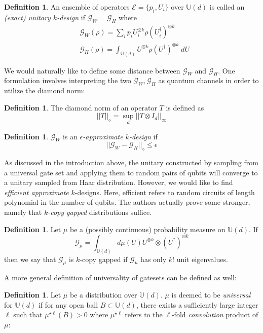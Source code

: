 \documentclass[12pt]{amsart}
\theoremstyle{definition}
\newtheorem{definition}[theorem]{Definition}
\theoremstyle{remark}
\numberwithin{equation}{section}
\theoremstyle{remark}
\begin{document}
\begin{definition}
  An ensemble of operators $\mathcal{E} = \{p_i, U_i\}$ over $\mathbb{U}(d)$ is called an \emph{(exact) unitary $k$-design} if $\mathcal{G}_W = \mathcal{G}_H$ where
  \begin{align}
    & \mathcal{G}_W(\rho) = \sum_{i} p_i U_i^{\otimes k}\rho (U_i^{\dagger})^{\otimes k} \\
    & \mathcal{G}_H(\rho) = \int_{\mathbb{U}(d)} U^{\otimes k} \rho (U^\dagger)^{\otimes k} \; dU
  \end{align}
\end{definition}
%
 We would naturally like to define some distance between $\mathcal{G}_W$ and $\mathcal{G}_H$. One formulation involves interpreting the two $\mathcal{G}_W, \mathcal{G}_H$ as quantum channels in order to utilize the diamond norm:
%
\begin{definition}
  The diamond norm of an operator $T$ is defined as
  $$||T||_{\diamond} = \sup_d ||T \otimes I_d ||_{\infty} $$
\end{definition}
%
\begin{definition}
  $\mathcal{G}_W$ is an \emph{$\epsilon$-approximate $k$-design} if
  \begin{equation}
    ||\mathcal{G}_W - \mathcal{G}_H ||_{\diamond}  \leq \epsilon
  \end{equation}
\end{definition}
%
As discussed in the introduction above, the unitary constructed by sampling from a universal gate set and applying them to random pairs of qubits will converge to a unitary sampled from Haar distribution. However, we would like to find \emph{efficient approximate} $k$-designs. Here, efficient refers to random circuits of length polynomial in the number of qubits. The authors actually prove some stronger, namely that \emph{$k$-copy gapped} distributions suffice.
%
\begin{definition} \label{gappeddef}
  Let $\mu$ be a (possibly continuous) probability measure on $\mathbb{U}(d)$. If
  \begin{equation}
    \mathcal{G}_{\mu} = \int_{\mathbb{U}(d)} d\mu(U) U^{\otimes k} \otimes (U^*)^{\otimes k}
  \end{equation}
  then we say that $\mathcal{G}_\mu$ is $k$-copy gapped if $\mathcal{G}_\mu$ has only $k!$ unit eigenvalues.
\end{definition}
%
\noindent A more general definition of universality of gatesets can be defined as well:
%
\begin{definition} \label{univdef}
  Let $\mu$ be a distribution over $\mathbb{U}(d)$. $\mu$ is deemed to be \emph{universal} for $\mathbb{U}(d)$ if for any open ball $B \subset \mathbb{U}(d)$, there exists a sufficiently large integer $\ell$ such that $\mu^{\star \ell}(B) > 0$
  where $\mu^{\star \ell}$ refers to the $\ell$-fold \emph{convolution} product of $\mu$:
\end{definition}
\end{document}
